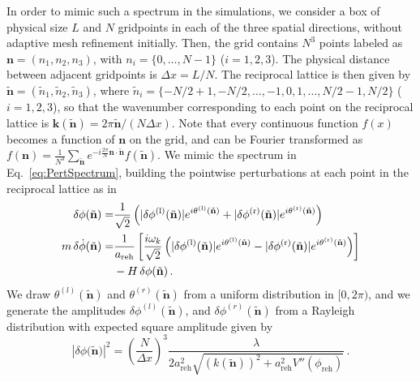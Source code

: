 \documentclass[
    reprint,
    preprintnumbers,
    superscriptaddress,
    nofootinbib,
     amsmath,amssymb,
     aps,
     prd,
    floatfix,
    ]{revtex4-2}
\newcommand{\reh}{_\mathrm{reh}}
\begin{document}
In order to mimic such a spectrum in the simulations, we consider a box of physical size $L$ and $N$ gridpoints in each of the three spatial directions, without adaptive mesh refinement initially. Then, the grid contains $N^3$ points labeled as $\mathbf{n} = (n_1, n_2, n_3)$, with $n_i = \lbrace 0, \dots, N-1\rbrace$ ($i = 1, 2, 3$). The physical distance between adjacent gridpoints is $\Delta x = L/N$. The reciprocal lattice is then given by $\tilde{\mathbf{n}} = (\tilde{n}_1, \tilde{n}_2, \tilde{n}_3)$, where $\tilde{n}_i = \lbrace -N/2+1, -N/2, \dots, -1, 0, 1, \dots, N/2-1, N/2 \rbrace$ ($i = 1,2,3$), so that the wavenumber corresponding to each point on the reciprocal lattice is $\mathbf{k}(\mathbf{\tilde{n}}) = 2 \pi \mathbf{\tilde{n}}/(N \Delta x)$. Note that every continuous function $f(x)$ becomes a function of $\mathbf{n}$ on the grid, and can be Fourier transformed as $f(\mathbf{n}) = \frac{1}{N^3} \sum_{\mathbf{\tilde{n}}} e^{-i \frac{2 \pi}{N} \mathbf{n} \cdot \mathbf{\tilde{n}}} f(\mathbf{\tilde{n}})$. We mimic the spectrum in Eq.~\eqref{eq:PertSpectrum}, building the pointwise perturbations at each point in the reciprocal lattice as in~\cite{Figueroa:2020rrl}
\begin{align}
\delta \phi(\tilde{\mathbf{n}}) =& \frac{1}{\sqrt{2}} \left(|\delta\phi^{\rm(l)} (\tilde{\mathbf{n}})| e^{i \theta^{\rm(l)} (\tilde{\mathbf{n}})} + |\delta\phi^{\rm(r)} (\tilde{\mathbf{n}})| e^{i \theta^{\rm(r)} (\tilde{\mathbf{n}})}\right) \nonumber \\
m \,\delta \dot\phi(\tilde{\mathbf{n}}) =& \frac{1}{a\reh} \left[\frac{i \omega_k}{\sqrt{2}} \left(|\delta\phi^{\rm(l)} (\tilde{\mathbf{n}})| e^{i \theta^{\rm(l)} (\tilde{\mathbf{n}})} - |\delta\phi^{\rm(r)} (\tilde{\mathbf{n}})| e^{i \theta^{\rm(r)} (\tilde{\mathbf{n}}) }\right)\right]  \nonumber \\
&- H \, \delta\phi(\tilde{\mathbf{n}}) \,. \nonumber
\end{align}
We draw $\theta^{(l)}(\tilde{\mathbf{n}})$ and $\theta^{(r)}(\tilde{\mathbf{n}})$ from a uniform distribution in $[0, 2\pi)$, and we generate the amplitudes $\delta\phi^{(l)}(\tilde{\mathbf{n}})$, and $\delta\phi^{(r)}(\tilde{\mathbf{n}})$ from a Rayleigh distribution with expected square amplitude given by
\begin{equation}
|\delta\phi(\mathbf{\tilde{n})}|^2 = \left(\frac{N}{\Delta x}\right)^3 \frac{\lambda}{2 a\reh^2 \sqrt{(k(\mathbf{\tilde{n}}))^2 + a\reh^2 V''(\phi\reh)}} \,.
\end{equation}
\end{document}
